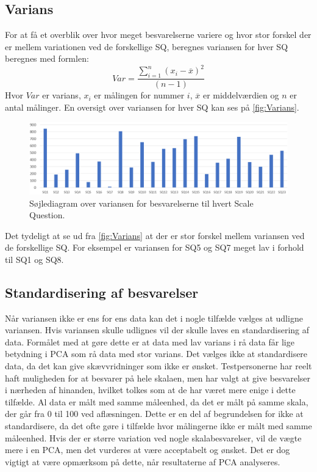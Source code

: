 \subsection{Varians}
%
For at få et overblik over hvor meget besvarelserne variere og hvor stor forskel der er mellem variationen ved de forskellige SQ, beregnes variansen for hver SQ beregnes med formlen: \blankline
%
\begin{equation}
	Var = \frac{\sum_{i=1}^{n}(x_i-\overline{x})^{2}}{(n-1)}
\end{equation}
\noindent
%
Hvor $Var$ er varians, $x_i$ er målingen for nummer $i$, $\overline{x}$ er middelværdien og $n$ er antal målinger. 
En oversigt over variansen for hver SQ kan ses på \autoref{fig:Varians}. 
%
\begin{figure}[H]
\centering
\includegraphics[width = \textwidth]{Figure/DatabehandlingSkalaer/Varians} 
\caption{Søjlediagram over variansen for besvarelserne til hvert Scale Question.}
\label{fig:Varians}
\end{figure}
\noindent
%
Det tydeligt at se ud fra \autoref{fig:Varians} at der er stor forskel mellem variansen ved de forskellige SQ. For eksempel er variansen for SQ5 og SQ7 meget lav i forhold til SQ1 og SQ8. 
%
\subsection{Standardisering af besvarelser}
Når variansen ikke er ens for ens data kan det i nogle tilfælde vælges at udligne variansen. Hvis variansen skulle udlignes vil der skulle laves en standardisering af data. Formålet med at gøre dette er at data med lav varians i rå data får lige betydning i PCA som rå data med stor varians. \blankline
%
Det vælges ikke at standardisere data, da det kan give skævvridninger som ikke er ønsket. Testpersonerne har reelt haft muligheden for at besvarer på hele skalaen, men har valgt at give besvarelser i nærheden af hinanden, hvilket tolkes som at de har været mere enige i dette tilfælde. \blankline
%
Al data er målt med samme måleenhed, da det er målt på samme skala, der går fra 0 til 100 ved aflæsningen. Dette er en del af begrundelsen for ikke at standardisere, da det ofte gøre i tilfælde hvor målingerne ikke er målt med samme måleenhed. \blankline
%
Hvis der er større variation ved nogle skalabesvarelser, vil de vægte mere i en PCA, men det vurderes at være acceptabelt og ønsket. Det er dog vigtigt at være opmærksom på dette, når resultaterne af PCA analyseres. 
